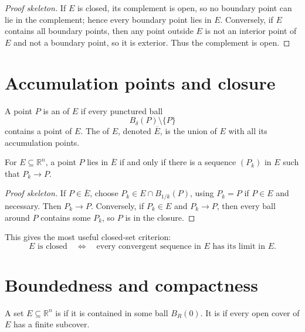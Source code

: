 \begin{proof}[Proof skeleton]
If \(E\) is closed, its complement is open, so no boundary point can lie in the complement; hence every boundary point lies in \(E\).  Conversely, if \(E\) contains all boundary points, then any point outside \(E\) is not an interior point of \(E\) and not a boundary point, so it is exterior.  Thus the complement is open.
\end{proof}

\section{Accumulation points and closure}

\begin{definition}
A point \(P\) is an  of \(E\) if every punctured ball
\[
  B_\delta(P)\setminus\{P\}
\]
contains a point of \(E\).  The  of \(E\), denoted \(\overline E\), is the union of \(E\) with all its accumulation points.
\end{definition}

\begin{proposition}
For \(E\subseteq\mathbb R^n\), a point \(P\) lies in \(\overline E\) if and only if there is a sequence \((P_k)\) in \(E\) such that \(P_k\to P\).
\end{proposition}

\begin{proof}[Proof skeleton]
If \(P\in\overline E\), choose \(P_k\in E\cap B_{1/k}(P)\), using \(P_k=P\) if \(P\in E\) and necessary.  Then \(P_k\to P\).  Conversely, if \(P_k\in E\) and \(P_k\to P\), then every ball around \(P\) contains some \(P_k\), so \(P\) is in the closure.
\end{proof}

This gives the most useful closed-set criterion:
\[
  E\text{ is closed}\quad\Longleftrightarrow\quad
  \text{every convergent sequence in }E\text{ has its limit in }E.
\]

\section{Boundedness and compactness}

\begin{definition}
A set \(E\subseteq\mathbb R^n\) is  if it is contained in some ball \(B_R(0)\).  It is  if every open cover of \(E\) has a finite subcover.
\end{definition}

